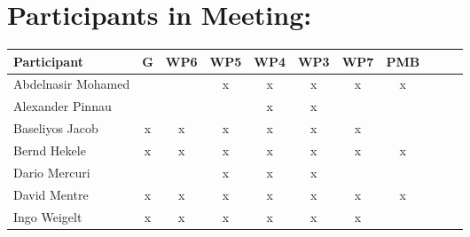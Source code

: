 \documentclass[a4paper, 11pt]{article}
\begin{document}
\section{Participants in Meeting:}

\begin{tabular}{|l|c|c|c|c||c|c|c||c|c|c|}
\hline
\textbf{Participant}  & \textbf{G} & \textbf{WP6} &  \textbf{WP5} & \textbf{WP4}&  \textbf{WP3} & \textbf{WP7}&  \textbf{PMB} \\\hline
Abdelnasir Mohamed    &  &   & x & x  & x &x  &x  \\\hline 
Alexander Pinnau      &   &   &   & x & x &  &  \\\hline  
Baseliyos Jacob       & x & x & x & x & x & x &  \\\hline 
Bernd Hekele          & x & x & x & x & x & x & x \\\hline
Dario Mercuri         &   &   & x & x & x &  &   \\\hline
David Mentre          & x & x & x & x & x & x & x \\\hline
Ingo Weigelt          & x & x & x & x & x & x &   \\\hline

\end{tabular}
\end{document}
